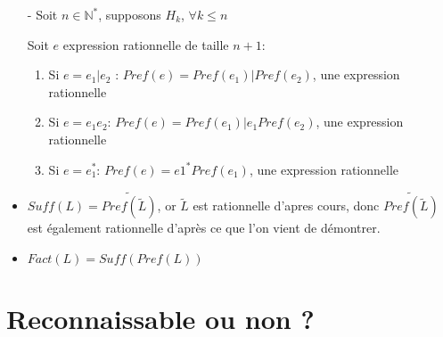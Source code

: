 \documentclass{article}
\newcommand{\bb}[1]{\mathbb{#1}}
\begin{document}
\begin{enumerate}
\begin{itemize}
        \item[-] Soit $n \in \bb{N}^*$, supposons $H_k$, $\forall k \leq n$
        \item[] Soit $e$ expression rationnelle de taille $n + 1$:
        \item[] \begin{enumerate}
            \item Si $e = e_1 | e_2$ : $Pref(e) = Pref(e_1)|Pref(e_2)$, une expression rationnelle
            \item Si $e = e_1e_2$: $Pref(e) = Pref(e_1)|e_1Pref(e_2)$, une expression rationnelle
            \item Si $e = e_1^*$: $Pref(e) = e1^*Pref(e_1)$, une expression rationnelle
        \end{enumerate}
        \item $Suff(L) = \widetilde{Pref(\tilde L)}$, or $\tilde L$ est rationnelle d'apres cours, donc $\widetilde{Pref(\tilde L)}$ est également rationnelle d'après ce que l'on vient de démontrer.
        \item $Fact(L) = Suff(Pref(L))$ 
    \end{itemize}
\end{enumerate}

\section{Reconnaissable ou non ?}
\end{document}
